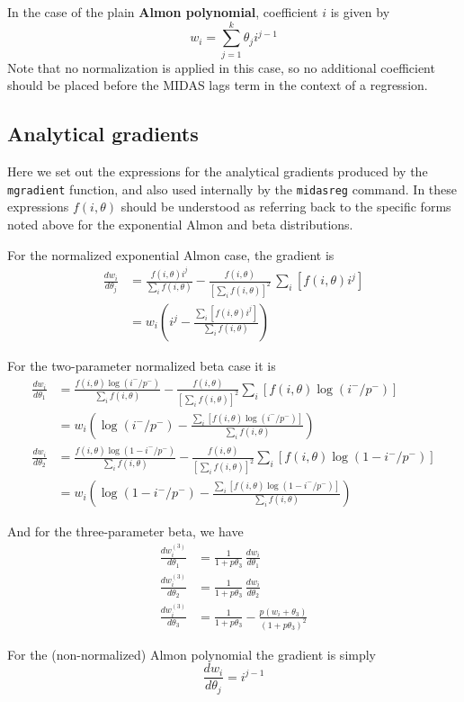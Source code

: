 \documentclass{article}
\begin{document}
In the case of the plain \textbf{Almon polynomial}, coefficient $i$
is given by
\[
w_i = \sum_{j=1}^k \theta_j i^{j-1}
\]
Note that no normalization is applied in this case, so no additional
coefficient should be placed before the MIDAS lags term in the context
of a regression.

\subsection*{Analytical gradients}

Here we set out the expressions for the analytical gradients produced
by the \texttt{mgradient} function, and also used internally by the
\texttt{midasreg} command. In these expressions $f(i,\theta)$ should
be understood as referring back to the specific forms noted above
for the exponential Almon and beta distributions. 

For the normalized exponential Almon case, the gradient is
\begin{align*}
\frac{dw_i}{d\theta_j} &= 
\frac{f(i, \theta) i^j}{\sum_if(i, \theta)} - 
\frac{f(i, \theta)}{\left[\sum_if(i, \theta)\right]^2}
\, \sum_i\left[f(i, \theta) i^j\right] \\[4pt]
 &= w_i \left(i^j - 
\frac{\sum_i\left[f(i,\theta)i^j\right]}{\sum_i f(i, \theta)}\right)
\end{align*}

For the two-parameter normalized beta case it is
\begin{align*}
\frac{dw_i}{d\theta_1} &=
\frac{f(i,\theta) \log(i^-/p^-)}{\sum_i f(i, \theta)} -
\frac{f(i,\theta)}{\left[\sum_i f(i,\theta)\right]^2}
\sum_i\left[f(i,\theta) \log(i^-/p^-)\right] \\[4pt]
&= w_i \left(\log(i^-/p^-) - 
\frac{\sum_i\left[f(i,\theta) \log(i^-/p^-)\right]}{\sum_i 
 f(i,\theta)}\right) \\[8pt]
\frac{dw_i}{d\theta_2} &=
\frac{f(i,\theta) \log(1 - i^-/p^-)}{\sum_i f(i, \theta)} -
\frac{f(i,\theta)}{\left[\sum_i f(i,\theta)\right]^2}
\sum_i\left[f(i,\theta) \log(1 - i^-/p^-)\right] \\[4pt]
&= w_i \left(\log(1 - i^-/p^-) - 
\frac{\sum_i\left[f(i,\theta) \log(1 - i^-/p^-)\right]}{\sum_i 
 f(i,\theta)}\right)
\end{align*}

And for the three-parameter beta, we have
\begin{align*}
\frac{dw^{(3)}_i}{d\theta_1} &= 
  \frac{1}{1+p\theta_3} \, \frac{dw_i}{d\theta_1} \\
\frac{dw^{(3)}_i}{d\theta_2} &= 
  \frac{1}{1+p\theta_3} \, \frac{dw_i}{d\theta_2} \\
\frac{dw^{(3)}_i}{d\theta_3} &=
\frac{1}{1+p\theta_3} - \frac{p(w_i + \theta_3)}{(1+p\theta_3)^2}
\end{align*}

For the (non-normalized) Almon polynomial the gradient is simply
\[
\frac{dw_i}{d\theta_j} = i^{j-1}
\]
\end{document}

